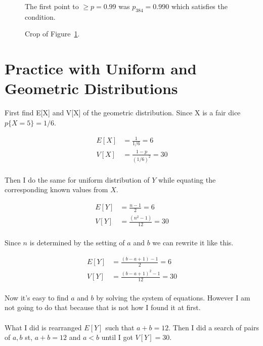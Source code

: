 \documentclass[twocolumn]{article}
\begin{document}
\begin{figure}[H]
    \centering
    \caption{The first point to $\ge p=0.99$ was $p_{384}=0.990$ which satisfies the condition.}
    \label{fig:Figure2}
\end{figure}

\begin{figure}[H]
    \centering
    \caption{Crop of Figure~\ref{fig:Figure2}.}
\end{figure}


\section{Practice with Uniform and Geometric Distributions}

First find E[X] and V[X] of the geometric distribution. Since X is a fair dice $p\{X=5\}= 1/6$.

\begin{align*}
E[X] &= \frac{1}{1/6} = 6 \\
V[X] &= \frac{1-p}{(1/6)^2} = 30 \\
\end{align*}

Then I do the same for uniform distribution of $Y$ while equating the corresponding known values from $X$.

\begin{align*}
E[Y] &= \frac{n-1}{2} = 6 \\
V[Y] &= \frac{(n^2-1)}{12} = 30 \\
\end{align*}

Since $n$ is determined by the setting of $a$ and $b$ we can rewrite it like this.

\begin{align*}
E[Y] &= \frac{(b-a+1)-1}{2} = 6 \\
V[Y] &= \frac{(b-a+1)^2-1}{12} = 30 \\
\end{align*}

Now it's easy to find $a$ and $b$ by solving the system of equations. However I am not going to do that because that is not how I found it at first.
\\
\\
What I did is rearranged $E[Y]$ such that $a+b=12$. Then I did a search of pairs of $a,b$ st, $a+b=12$ and $a<b$ until I got $V[Y]=30$.
\end{document}
